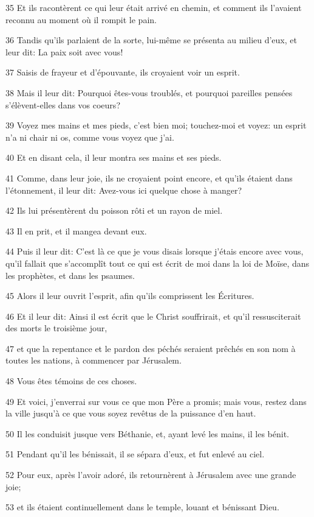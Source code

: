 \par 35 Et ils racontèrent ce qui leur était arrivé en chemin, et comment ils l'avaient reconnu au moment où il rompit le pain.
\par 36 Tandis qu'ils parlaient de la sorte, lui-même se présenta au milieu d'eux, et leur dit: La paix soit avec vous!
\par 37 Saisis de frayeur et d'épouvante, ils croyaient voir un esprit.
\par 38 Mais il leur dit: Pourquoi êtes-vous troublés, et pourquoi pareilles pensées s'élèvent-elles dans vos coeurs?
\par 39 Voyez mes mains et mes pieds, c'est bien moi; touchez-moi et voyez: un esprit n'a ni chair ni os, comme vous voyez que j'ai.
\par 40 Et en disant cela, il leur montra ses mains et ses pieds.
\par 41 Comme, dans leur joie, ils ne croyaient point encore, et qu'ils étaient dans l'étonnement, il leur dit: Avez-vous ici quelque chose à manger?
\par 42 Ils lui présentèrent du poisson rôti et un rayon de miel.
\par 43 Il en prit, et il mangea devant eux.
\par 44 Puis il leur dit: C'est là ce que je vous disais lorsque j'étais encore avec vous, qu'il fallait que s'accomplît tout ce qui est écrit de moi dans la loi de Moïse, dans les prophètes, et dans les psaumes.
\par 45 Alors il leur ouvrit l'esprit, afin qu'ils comprissent les Écritures.
\par 46 Et il leur dit: Ainsi il est écrit que le Christ souffrirait, et qu'il ressusciterait des morts le troisième jour,
\par 47 et que la repentance et le pardon des péchés seraient prêchés en son nom à toutes les nations, à commencer par Jérusalem.
\par 48 Vous êtes témoins de ces choses.
\par 49 Et voici, j'enverrai sur vous ce que mon Père a promis; mais vous, restez dans la ville jusqu'à ce que vous soyez revêtus de la puissance d'en haut.
\par 50 Il les conduisit jusque vers Béthanie, et, ayant levé les mains, il les bénit.
\par 51 Pendant qu'il les bénissait, il se sépara d'eux, et fut enlevé au ciel.
\par 52 Pour eux, après l'avoir adoré, ils retournèrent à Jérusalem avec une grande joie;
\par 53 et ils étaient continuellement dans le temple, louant et bénissant Dieu.


